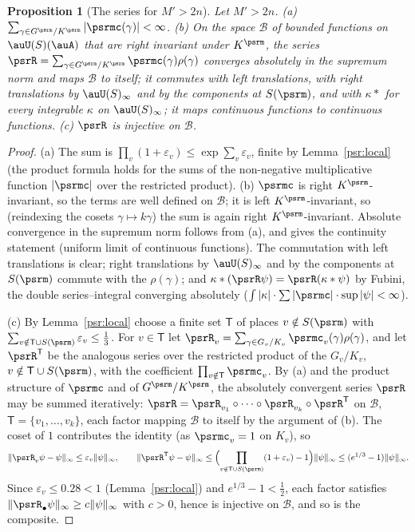 \documentclass[10pt]{amsart}
\newtheorem{proposition}[theorem]{Proposition}
\theoremstyle{definition}
\theoremstyle{remark}
\begin{document}
\begin{proposition}[The series for $M'>2n$]\label{psr:series}
Let $M'>2n$. \textup{(a)} $\sum_{\gamma\in G^\psrm/K^\psrm}|\psrmc(\gamma)|<\infty$. \textup{(b)} On the space
$\mathcal B$ of bounded functions on $\auU(S)(\auA)$ that are right invariant under $K^\psrm$, the
series $\psrR=\sum_{\gamma\in G^\psrm/K^\psrm}\psrmc(\gamma)\rho(\gamma)$ converges absolutely in the
supremum norm and maps $\mathcal B$ to itself; it commutes with left translations, with right
translations by $\auU(S)_\infty$ and by the components at $S(\psrm)$, and with $\kappa*$ for every
integrable $\kappa$ on $\auU(S)_\infty$; it maps continuous functions to continuous functions.
\textup{(c)} $\psrR$ is injective on $\mathcal B$.
\end{proposition}
\begin{proof}
(a) The sum is $\prod_v(1+\varepsilon_v)\le\exp\sum_v\varepsilon_v$, finite by Lemma~\ref{psr:local} (the
product formula holds for the sums of the non-negative multiplicative function $|\psrmc|$ over the
restricted product). (b) $\psrmc$ is right $K^\psrm$-invariant, so the terms are well defined on $\mathcal
B$; it is left $K^\psrm$-invariant, so (reindexing the cosets $\gamma\mapsto k\gamma$) the sum is again
right $K^\psrm$-invariant. Absolute convergence in the supremum norm follows from (a), and gives the
continuity statement (uniform limit of continuous functions). The commutation with left translations
is clear; right translations by $\auU(S)_\infty$ and by the components at $S(\psrm)$ commute with the
$\rho(\gamma)$; and $\kappa*(\psrR\psi)=\psrR(\kappa*\psi)$ by Fubini, the double series--integral
converging absolutely ($\int|\kappa|\cdot\sum|\psrmc|\cdot\sup|\psi|<\infty$).

(c) By Lemma~\ref{psr:local} choose a finite set $\mathsf T$ of places $v\notin S(\psrm)$ with
$\sum_{v\notin\mathsf T\cup S(\psrm)}\varepsilon_v\le\frac13$. For $v\in\mathsf T$ let
$\psrR_v=\sum_{\gamma\in G_v/K_v}\psrmc_v(\gamma)\rho(\gamma)$, and let $\psrR^{\mathsf T}$ be the analogous
series over the restricted product of the $G_v/K_v$, $v\notin\mathsf T\cup S(\psrm)$, with the
coefficient $\prod_{v\notin\mathsf T}\psrmc_v$. By (a) and the product structure of $\psrmc$ and of
$G^\psrm/K^\psrm$, the absolutely convergent series $\psrR$ may be summed iteratively:
$\psrR=\psrR_{v_1}\circ\dots\circ\psrR_{v_k}\circ\psrR^{\mathsf T}$ on $\mathcal B$, $\mathsf T=\{v_1,\dots,v_k\}$,
each factor mapping $\mathcal B$ to itself by the argument of (b). The coset of $1$ contributes the
identity (as $\psrmc_v=1$ on $K_v$), so
\[
\|\psrR_v\psi-\psi\|_\infty\le\varepsilon_v\|\psi\|_\infty,\qquad
\|\psrR^{\mathsf T}\psi-\psi\|_\infty\le\Bigl(\prod_{v\notin\mathsf T\cup S(\psrm)}(1+\varepsilon_v)-1\Bigr)
\|\psi\|_\infty\le(e^{1/3}-1)\|\psi\|_\infty .
\]
Since $\varepsilon_v\le0.28<1$ (Lemma~\ref{psr:local}) and $e^{1/3}-1<\frac12$, each factor satisfies
$\|\psrR_\bullet\psi\|_\infty\ge c\|\psi\|_\infty$ with $c>0$, hence is injective on $\mathcal B$, and so is
the composite.
\end{proof}
\end{document}
